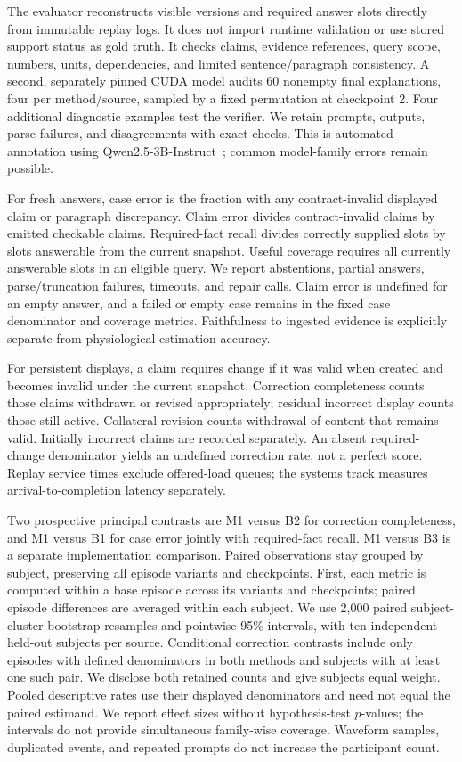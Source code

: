 The evaluator reconstructs visible versions and required answer slots directly
from immutable replay logs. It does not import runtime validation or use stored
support status as gold truth. It checks claims, evidence references, query scope,
numbers, units, dependencies, and limited sentence/paragraph consistency. A
second, separately pinned CUDA model audits 60 nonempty final explanations,
four per method/source, sampled by a fixed permutation at checkpoint 2. Four
additional diagnostic examples test the verifier. We retain prompts, outputs,
parse failures, and disagreements with exact checks. This is automated annotation
using Qwen2.5-3B-Instruct~\cite{qwen25}; common model-family errors remain possible.

For fresh answers, case error is the fraction with any contract-invalid displayed
claim or paragraph discrepancy. Claim error divides contract-invalid claims by
emitted checkable claims. Required-fact recall divides correctly supplied slots
by slots answerable from the current snapshot. Useful coverage requires all
currently answerable slots in an eligible query. We report abstentions,
partial answers, parse/truncation failures, timeouts, and repair calls. Claim
error is undefined for an empty answer, and a failed or empty case remains in
the fixed case denominator and coverage metrics. Faithfulness to ingested
evidence is explicitly separate from physiological estimation accuracy.

For persistent displays, a claim requires change if it was valid when created
and becomes invalid under the current snapshot. Correction completeness counts
those claims withdrawn or revised appropriately; residual incorrect display
counts those still active. Collateral revision counts withdrawal of content
that remains valid. Initially incorrect claims are recorded separately. An
absent required-change denominator yields an undefined correction rate, not a
perfect score. Replay service times exclude offered-load queues; the systems
track measures arrival-to-completion latency separately.

Two prospective principal contrasts are M1 versus B2 for correction completeness,
and M1 versus B1 for case error jointly with required-fact recall. M1 versus B3
is a separate implementation comparison. Paired observations stay grouped by
subject, preserving all episode variants and checkpoints. First, each metric is
computed within a base episode across its variants and checkpoints; paired episode
differences are averaged within each subject. We use 2,000 paired
subject-cluster bootstrap resamples and pointwise 95\% intervals, with ten
independent held-out subjects per source. Conditional correction contrasts
include only episodes with defined denominators in both methods and subjects with
at least one such pair. We disclose both retained counts and give subjects equal
weight. Pooled descriptive rates use their displayed denominators and need not
equal the paired estimand. We report effect sizes without hypothesis-test $p$-values;
the intervals do not provide simultaneous family-wise coverage. Waveform samples,
duplicated events, and repeated prompts do not increase the participant count.

